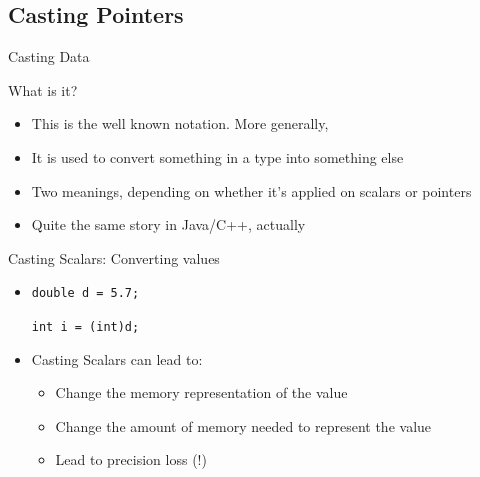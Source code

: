 \begin{Coupe}
\subsection{Casting Pointers}\subtoc
\begin{frame}{Casting Data}
  \vspace{-.5\baselineskip}
  \begin{block}{What is it?}
    \begin{itemize}\vspace{-.2\baselineskip}
    \item This is the well known  notation. More generally, 
    \item It is used to convert something in a type into something else
    \item Two meanings, depending on whether it's applied on scalars or
      pointers
    \item Quite the same story in Java/C++, actually
    \end{itemize}
  \end{block}\vspace{-.5\baselineskip}

  \begin{block}{Casting Scalars: Converting values}
    \begin{itemize}\vspace{-.2\baselineskip}
    \item \texttt{double d = 5.7;} ~~~~

      \texttt{int i = (int)d;} ~~~~

    \item<2-> Casting Scalars can lead to:
      \begin{itemize}
      \item Change the memory representation of the value
      \item Change the amount of memory needed to represent the value
      \item Lead to precision loss (!)
      \end{itemize}
    \end{itemize}
  \end{block}\vspace{-.5\baselineskip}


\end{frame}
\end{Coupe}
